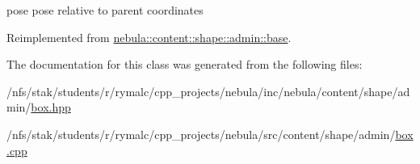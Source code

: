 pose pose relative to parent coordinates 

Reimplemented from \hyperlink{classnebula_1_1content_1_1shape_1_1admin_1_1base_a990f8b017a93fb4e430fc7ab880c5f27}{nebula::content::shape::admin::base}.

The documentation for this class was generated from the following files:\begin{DoxyCompactItemize}
\item 
/nfs/stak/students/r/rymalc/cpp\_\-projects/nebula/inc/nebula/content/shape/admin/\hyperlink{admin_2box_8hpp}{box.hpp}\item 
/nfs/stak/students/r/rymalc/cpp\_\-projects/nebula/src/content/shape/admin/\hyperlink{admin_2box_8cpp}{box.cpp}\end{DoxyCompactItemize}
